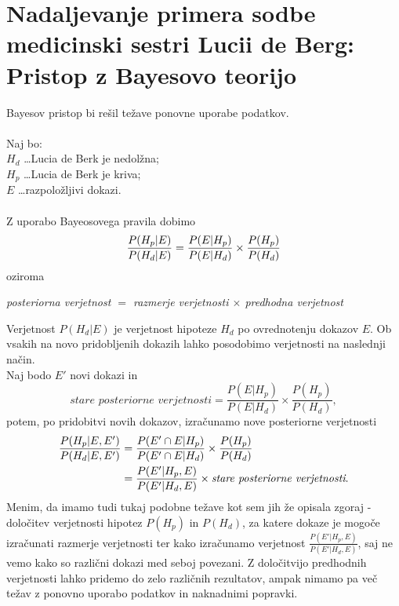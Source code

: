 \documentclass[12pt,a4paper]{amsart}
\theoremstyle{definition} %
\theoremstyle{plain} %
\begin{document}
\section{Nadaljevanje primera sodbe medicinski sestri Lucii de Berg: Pristop z Bayesovo teorijo}
Bayesov pristop bi rešil težave ponovne uporabe podatkov.\\\\
Naj bo:\\
$H_d$ \dots Lucia de Berk je nedolžna;\\
$H_p$ \dots Lucia de Berk je kriva;\\
$E$ \dots razpoložljivi dokazi.\\\\
Z uporabo Bayeosovega pravila dobimo
\[
    \frac{P(H_p \lvert E)}{P(H_d \lvert E)} = \frac{P(E \lvert H_p)}{P(E \lvert H_d)} \times \frac{P(H_p)}{P(H_d)} \vspace{2mm}
\]
oziroma\\
\begin{center}
    \textit{posteriorna verjetnost $=$ razmerje verjetnosti $\times$ predhodna verjetnost}  
\end{center}
Verjetnost $P(H_d \lvert E)$ je verjetnost hipoteze $H_d$ po ovrednotenju dokazov $E$. Ob vsakih na novo pridobljenih dokazih lahko posodobimo 
verjetnosti na naslednji način.\\
Naj bodo $E'$ novi dokazi in 
\[
    \textit{stare posteriorne verjetnosti}  = \frac{P(E \lvert H_p)}{P(E \lvert H_d)} \times \frac{P(H_p)}{P(H_d)},
\]
potem, po pridobitvi novih dokazov, izračunamo nove posteriorne verjetnosti
\begin{align*}
    \frac{P(H_p \lvert E, E')}{P(H_d \lvert E, E')} & = \frac{P(E' \cap E \lvert H_p)}{P(E' \cap E \lvert H_d)} \times \frac{P(H_p)}{P(H_d)} \\ \vspace{2mm}
    & = \frac{P(E' \lvert H_p, E)}{P(E' \lvert H_d, E)} \times \textit{stare posteriorne verjetnosti}. \vspace{2mm}
\end{align*}
Menim, da imamo tudi tukaj podobne težave kot sem jih že opisala zgoraj - določitev verjetnosti hipotez $P(H_p)$ in $P(H_d)$, za katere dokaze je mogoče 
izračunati razmerje verjetnosti ter kako izračunamo verjetnost $\frac{P(E' \lvert H_p, E)}{P(E' \lvert H_d, E)}$, saj ne vemo kako so različni dokazi med seboj 
povezani. Z določitvijo predhodnih verjetnosti lahko pridemo do zelo različnih rezultatov, ampak nimamo pa več težav z ponovno uporabo podatkov in 
naknadnimi popravki. 
\end{document}
